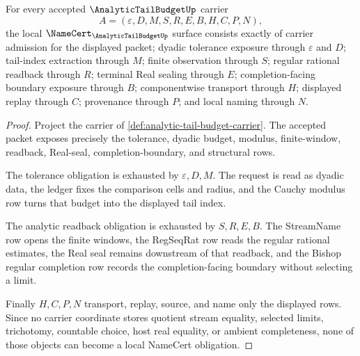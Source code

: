 \begin{theorem}
\label{thm:analytic-tail-budget-namecert-obligations}
For every accepted $\AnalyticTailBudgetUp$ carrier
$$
A=(\varepsilon,D,M,S,R,E,B,H,C,P,N),
$$
the local $\NameCert_{\AnalyticTailBudgetUp}$ surface consists exactly of carrier admission for the displayed packet; dyadic tolerance exposure through $\varepsilon$ and $D$; tail-index extraction through $M$; finite observation through $S$; regular rational readback through $R$; terminal Real sealing through $E$; completion-facing boundary exposure through $B$; componentwise transport through $H$; displayed replay through $C$; provenance through $P$; and local naming through $N$.
\end{theorem}
\begin{proof}
Project the carrier of \autoref{def:analytic-tail-budget-carrier}. The accepted packet exposes precisely the tolerance, dyadic budget, modulus, finite-window, readback, Real-seal, completion-boundary, and structural rows.

The tolerance obligation is exhausted by $\varepsilon,D,M$. The request is read as dyadic data, the ledger fixes the comparison cells and radius, and the Cauchy modulus row turns that budget into the displayed tail index.

The analytic readback obligation is exhausted by $S,R,E,B$. The StreamName row opens the finite windows, the RegSeqRat row reads the regular rational estimates, the Real seal remains downstream of that readback, and the Bishop regular completion row records the completion-facing boundary without selecting a limit.

Finally $H,C,P,N$ transport, replay, source, and name only the displayed rows. Since no carrier coordinate stores quotient stream equality, selected limits, trichotomy, countable choice, host real equality, or ambient completeness, none of those objects can become a local NameCert obligation.
\end{proof}

